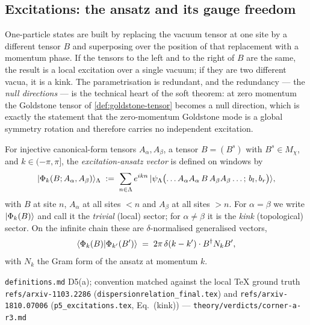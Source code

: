 \subsection{Excitations: the ansatz and its gauge freedom}

One-particle states are built by replacing the vacuum tensor at one site by a
different tensor $B$ and superposing over the position of that replacement with
a momentum phase. If the tensors to the left and to the right of $B$ are the
same, the result is a local excitation over a single vacuum; if they are two
different vacua, it is a kink. The parametrisation is redundant, and the
redundancy --- the \emph{null directions} --- is the technical heart of the
soft theorem: at zero momentum the Goldstone tensor of
\cref{def:goldstone-tensor} becomes a null direction, which is exactly the
statement that the zero-momentum Goldstone mode is a global symmetry rotation
and therefore carries no independent excitation.

\begin{definition}
\label{def:excitation-ansatz}
For injective canonical-form tensors $A_{\alpha}, A_{\beta}$, a tensor
$B = (B^{s})$ with $B^{s} \in M_{\chi}$, and $k \in (-\pi,\pi]$, the
\emph{excitation-ansatz vector} is defined on windows by
\begin{equation}
  |\Phi_{k}(B; A_{\alpha}, A_{\beta})\rangle_{\Lambda}
  \; := \; \sum_{n \in \Lambda} e^{ikn} \,
  |\psi_{\Lambda}\bigl( \ldots A_{\alpha} A_{\alpha} \, B \,
       A_{\beta} A_{\beta} \ldots ; \, b_{l}, b_{r} \bigr)\rangle,
  \label{eq:excitation-ansatz}
\end{equation}
with $B$ at site $n$, $A_{\alpha}$ at all sites $< n$ and $A_{\beta}$ at all
sites $> n$. For $\alpha = \beta$ we write $|\Phi_{k}(B)\rangle$ and call it the
\emph{trivial} (local) sector; for $\alpha \neq \beta$ it is the \emph{kink}
(topological) sector. On the infinite chain these are $\delta$-normalised
generalised vectors,
\begin{equation}
  \langle \Phi_{k}(B) \vert \Phi_{k'}(B')\rangle
  \;=\; 2\pi \, \delta(k-k') \cdot B^{\dagger} N_{k} B' ,
  \label{eq:delta-normalisation}
\end{equation}
with $N_{k}$ the Gram form of the ansatz at momentum $k$.
\end{definition}

%
{\texttt{definitions.md} D5(a); convention matched against the local \TeX{}
 ground truth \texttt{refs/arxiv-1103.2286} (\texttt{dispersionrelation\_final.tex})
 and \texttt{refs/arxiv-1810.07006} (\texttt{p5\_excitations.tex}, Eq.~(kink))}%
{---}%
{\texttt{theory/verdicts/corner-a-r3.md}}

